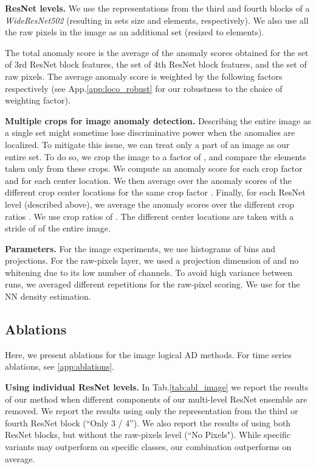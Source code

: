 \documentclass{article}
\begin{document}
\textbf{ResNet levels.} We use the representations from the third and fourth blocks of a \textit{WideResNet502} (resulting in sets size  and  elements, respectively). We also use all the raw pixels in the image as an additional set (resized to  elements). 

The total anomaly score is the average of the anomaly scores obtained for the set of 3rd ResNet block features, the set of 4th ResNet block features, and the set of raw pixels. The average anomaly score is weighted by the following factors  respectively (see App.\ref{app:loco_robust} for our robustness to the choice of weighting factor).



\textbf{Multiple crops for image anomaly detection.} Describing the entire image as a single set might sometime lose discriminative power when the anomalies are localized. To mitigate this issue, we can treat only a part of an image as our entire set. To do so, we crop the image to a factor of , and compare the elements taken only from these crops. We compute an anomaly score for each crop factor and for each center location. We then average over the anomaly scores of the different crop center locations for the same crop factor . Finally, for each ResNet level (described above), we average the anomaly scores over the different crop ratios . We use crop ratios of . The different center locations are taken with a stride of  of the entire image.






\textbf{Parameters.} For the image experiments, we use histograms of  bins and  projections. For the raw-pixels layer, we used a projection dimension of  and no whitening due to its low number of channels. To avoid high variance between runs, we averaged  different repetitions for the raw-pixel scoring. We use  for the NN density estimation.

\subsection{Ablations} 
\label{sec:ablation}

Here, we present ablations for the image logical AD methods. For time series ablations, see \cref{app:ablations}.

\textbf{Using individual ResNet levels.}
In Tab.\ref{tab:abl_image} we report the results of our method when different components of our multi-level ResNet ensemble are removed. We report the results using only the representation from the third or fourth ResNet block (``Only 3 / 4''). We also report the results of using both ResNet blocks, but without the raw-pixels level (``No Pixels"). 
While specific variants may outperform on specific classes, our combination outperforms on average. 
\end{document}
